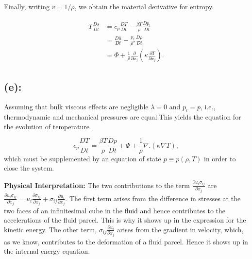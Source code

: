 \documentclass{article}
\begin{document}
Finally, writing $v = 1/\rho$, we obtain the material derivative for entropy.

\begin{align}\label{eq:entropy}
 \begin{split}
  T \frac{Ds}{Dt} &= c_{p} \frac{DT}{Dt} - \frac{\beta T}{\rho}\frac{Dp_{t}}{Dt}\\
  & = \frac{D\hat{u}}{Dt} - \frac{p_{t}}{\rho^{2}}\frac{D\rho}{Dt}\\
  & = \Phi + \frac{1}{\rho} \frac{\partial }{\partial x_{j}}\left(\kappa \frac{\partial T}{\partial x_{j}} \right).
 \end{split}
\end{align}
\subsection*{(e):}
Assuming that bulk viscous effects are negligible $\lambda = 0 $ and $p_{t} = p$, i.e., thermodynamic and mechanical pressures are equal.This yields the equation for the evolution of temperature. 

\begin{equation}\label{eq:temperature}
 c_{p}\frac{DT}{Dt} = \frac{\beta T}{\rho}\frac{Dp}{Dt} + \Phi + \frac{1}{\rho}\nabla.(\kappa \nabla T),
\end{equation}
which must be supplemented by an equation of state $p \equiv p(\rho, T)$ in order to close the system. 

\textbf{Physical Interpretation:}
The two contributions to the term $\frac{\partial u_{i}\sigma_{ij}}{\partial x_{j}}$ are $\frac{\partial u_{i}\sigma_{ij}}{\partial x_{j}} = u_{i} \frac{\partial \sigma_{ij}}{\partial x_{j}} + \sigma_{ij}\frac{\partial u_{i}}{\partial x_{j}} $. The first term arises from the difference in stresses at the two faces of an infinitesimal cube in the fluid and hence contributes to the accelerations of the fluid parcel. This is why it shows up in the expression for the kinetic energy. The other term,  $\sigma_{ij}\frac{\partial u_{i}}{\partial x_{j}}$ arises from the gradient in velocity, which, as we know, contributes to the deformation of a fluid parcel. Hence it shows up in the internal energy equation. 
\end{document}

